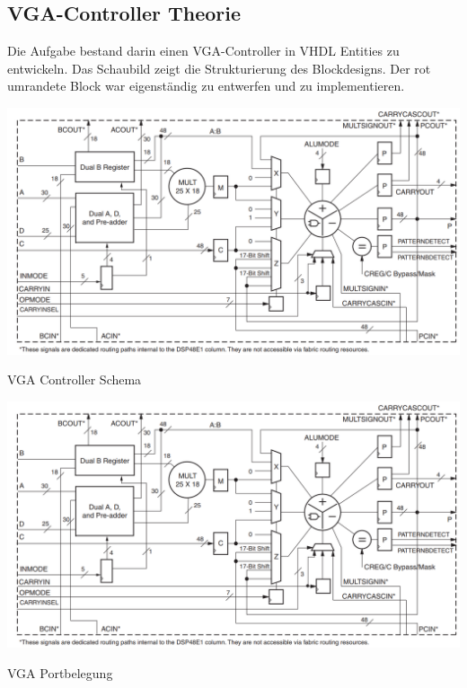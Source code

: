 \subsection {VGA-Controller Theorie}
Die Aufgabe bestand darin einen VGA-Controller in VHDL Entities zu entwickeln. Das Schaubild zeigt die Strukturierung 
des Blockdesigns. Der rot umrandete Block war eigenständig zu entwerfen und zu implementieren. \\
\begin{minipage}{\textwidth}
    \begin{center}        
        \includegraphics[scale=0.5]{img/DSP48e.png} 
    \end{center}
\end{minipage}
\begin{center}
VGA Controller Schema
\end{center}

\begin{minipage}{\textwidth}
    \begin{center}        
        \includegraphics[scale=0.5]{img/DSP48e.png} 
    \end{center}
\end{minipage}
\begin{center}
VGA Portbelegung
\end{center}

